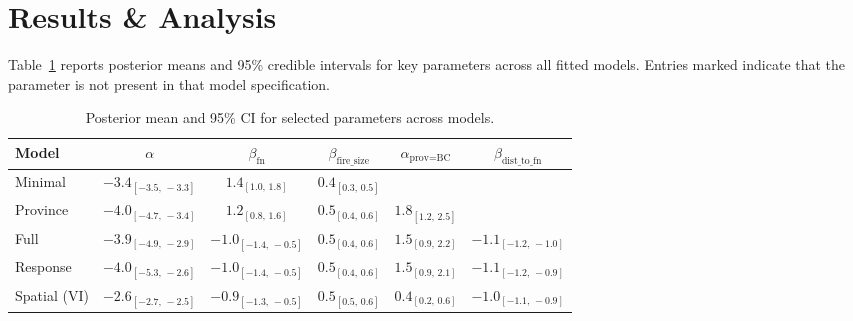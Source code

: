 \section{Results \& Analysis}\label{sec:results}

Table~\ref{tab:key_param_comparison} reports posterior means and 95\% credible intervals for key parameters across all fitted models. Entries marked \textemdash{} indicate that the parameter is not present in that model specification.

\begin{table}[h!]
\centering
\caption{Posterior mean and 95\% CI for selected parameters across models.}
\label{tab:key_param_comparison}
\begin{tabular}{lccccc}
\hline
Model & $\alpha$ & $\beta_{\mathrm{fn}}$ & $\beta_{\mathrm{fire\_size}}$ & $\alpha_{\text{prov=BC}}$ & $\beta_{\mathrm{dist\_to\_fn}}$ \\
\hline
Minimal & $-3.4_{[-3.5,\,-3.3]}$ & $1.4_{[1.0,\,1.8]}$ & $0.4_{[0.3,\,0.5]}$ & \textemdash{} & \textemdash{} \\
Province & $-4.0_{[-4.7,\,-3.4]}$ & $1.2_{[0.8,\,1.6]}$ & $0.5_{[0.4,\,0.6]}$ & $1.8_{[1.2,\,2.5]}$ & \textemdash{} \\
Full & $-3.9_{[-4.9,\,-2.9]}$ & $-1.0_{[-1.4,\,-0.5]}$ & $0.5_{[0.4,\,0.6]}$ & $1.5_{[0.9,\,2.2]}$ & $-1.1_{[-1.2,\,-1.0]}$ \\
Response & $-4.0_{[-5.3,\,-2.6]}$ & $-1.0_{[-1.4,\,-0.5]}$ & $0.5_{[0.4,\,0.6]}$ & $1.5_{[0.9,\,2.1]}$ & $-1.1_{[-1.2,\,-0.9]}$ \\
Spatial (VI) & $-2.6_{[-2.7,\,-2.5]}$ & $-0.9_{[-1.3,\,-0.5]}$ & $0.5_{[0.5,\,0.6]}$ & $0.4_{[0.2,\,0.6]}$ & $-1.0_{[-1.1,\,-0.9]}$ \\
\hline
\end{tabular}
\end{table}


